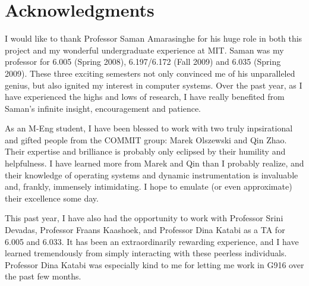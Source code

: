 % 

\cleardoublepage

\section*{Acknowledgments}
I would like to thank Professor Saman Amarasinghe for his huge role in both this project 
and my wonderful undergraduate experience at MIT. Saman was my professor for 6.005 (Spring 2008), 
6.197/6.172 (Fall 2009) and 6.035 (Spring 2009). These three exciting semesters 
not only convinced me of his unparalleled genius, but also ignited my interest in computer systems.  
Over the past year, as I have experienced the highs and lows of research, I have 
really benefited from Saman's infinite insight, encouragement and patience. 
 
As an M-Eng student, I have been blessed to work with two truly inpsirational and gifted people from the COMMIT group:
Marek Olszewski and Qin Zhao. Their expertise and brilliance is probably only eclipsed by their humility and 
helpfulness. I have learned more from Marek and Qin than I probably realize, and
their knowledge of operating systems
and dynamic instrumentation is invaluable and, frankly, immensely intimidating. 
I hope to emulate (or even approximate) their excellence some day.

This past year, I have also had the opportunity to work with Professor Srini Devadas, 
Professor Fraans Kaashoek, and Professor Dina Katabi as a TA for 6.005 and 6.033. It has been an extraordinarily
rewarding experience, and I have learned tremendously from simply interacting with these peerless individuals. Professor
Dina Katabi was especially kind to me for letting me work in G916 over the past few months.

